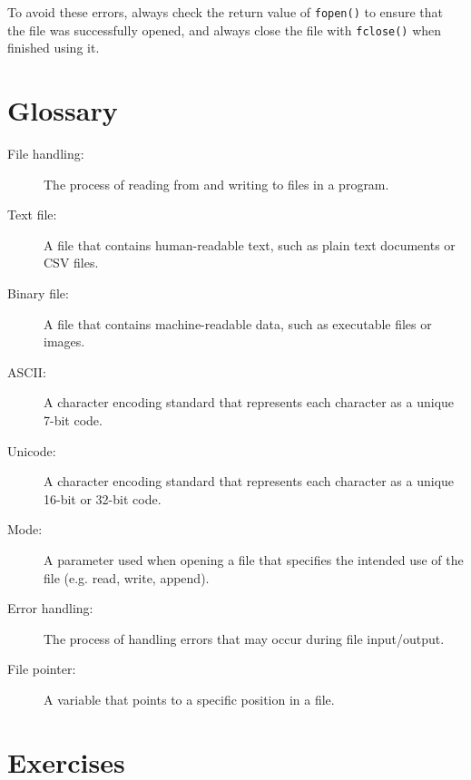To avoid these errors, always check the return value of {\tt fopen()} to ensure that the file was successfully opened, and always close the file with {\tt fclose()} when finished using it.

\section{Glossary}

\begin{description}
	\item[File handling:] The process of reading from and writing to files in a program.
	\item[Text file:] A file that contains human-readable text, such as plain text documents or CSV files.
	\item[Binary file:] A file that contains machine-readable data, such as executable files or images.
	\item[ASCII:] A character encoding standard that represents each character as a unique 7-bit code.
	\item[Unicode:] A character encoding standard that represents each character as a unique 16-bit or 32-bit code.
	\item[Mode:] A parameter used when opening a file that specifies the intended use of the file (e.g. read, write, append).
	\item[Error handling:] The process of handling errors that may occur during file input/output.
	\item[File pointer:] A variable that points to a specific position in a file.
\end{description}

\section{Exercises}
\setcounter{exercisenum}{0}




